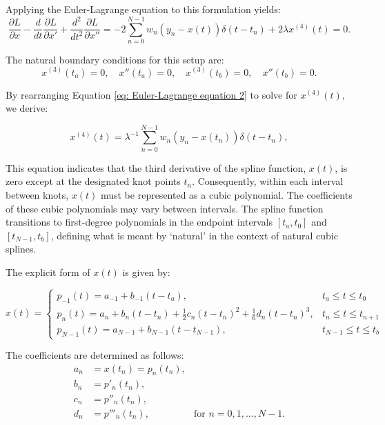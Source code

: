 \documentclass[
11pt, %
oneside, %
english, %
singlespacing, %
]{macthesis} %
\begin{document}
Applying the Euler-Lagrange equation to this formulation yields:
\begin{equation}
\frac{\partial L}{\partial x} - \frac{d}{dt} \frac{\partial L}{\partial x'} + \frac{d^2}{dt^2} \frac{\partial L}{\partial x''} = -2 \sum_{n=0}^{N-1} w_{n}(y_n - x(t)) \delta(t - t_n) + 2\lambda x^{(4)}(t) = 0.
\label{eq: Euler-Lagrange equation 2}
\end{equation}

The natural boundary conditions for this setup are:
\[
x^{(3)}(t_a) = 0, \quad x''(t_a) = 0, \quad x^{(3)}(t_b) = 0, \quad x''(t_b) = 0.
\]

By rearranging Equation \ref{eq: Euler-Lagrange equation 2} to solve for \(x^{(4)}(t)\), we derive:

\begin{equation}
x^{(4)}(t) = \lambda^{-1} \sum_{n=0}^{N-1} w_n (y_n - x(t_n)) \delta(t - t_n),
\label{eq:EL x4}
\end{equation}

This equation indicates that the third derivative of the spline function, \(x(t)\), is zero except at the designated knot points \(t_n\). Consequently, within each interval between knots, \(x(t)\) must be represented as a cubic polynomial. The coefficients of these cubic polynomials may vary between intervals. The spline function transitions to first-degree polynomials in the endpoint intervals \([t_a, t_0]\) and \([t_{N-1}, t_b]\), defining what is meant by `natural' in the context of natural cubic splines.

The explicit form of \(x(t)\) is given by:

\begin{equation}
x(t) = 
\begin{cases} 
p_{-1}(t) = a_{-1} + b_{-1}(t - t_a), & t_a \leq t \leq t_0 \\
p_n(t) = a_n + b_n(t - t_n) + \frac{1}{2} c_n(t - t_n)^2 + \frac{1}{6} d_n(t - t_n)^3, & t_n \leq t \leq t_{n+1} \\
p_{N-1}(t) = a_{N-1} + b_{N-1}(t - t_{N-1}), & t_{N-1} \leq t \leq t_b
\end{cases}
\label{eq:cubic_spline_form}
\end{equation}

The coefficients are determined as follows:
\[
\begin{aligned}
a_n &= x(t_n) = p_n(t_n), \\
b_n &= p'_n(t_n), \\
c_n &= p''_n(t_n), \\
d_n &= p'''_n(t_n), & \text{for } n = 0, 1, \ldots, N-1.
\end{aligned}
\]
\end{document}
